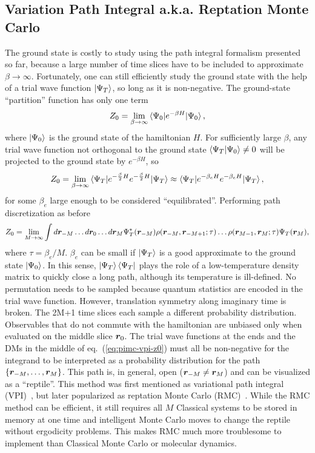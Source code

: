 \subsection{Variation Path Integral a.k.a. Reptation Monte Carlo}
The ground state is costly to study using the path integral formalism presented so far, because a large number of time slices have to be included to approximate $\beta\rightarrow\infty$. Fortunately, one can still efficiently study the ground state with the help of a trial wave function $\ket{\Psi_T}$, so long as it is non-negative. The ground-state ``partition'' function has only one term
\begin{align}
Z_0 = \lim\limits_{\beta\rightarrow\infty} \braket{\Psi_0|e^{-\beta H}|\Psi_0},
\end{align}
where $\ket{\Psi_0}$ is the ground state of the hamiltonian $H$.
For sufficiently large $\beta$, any trial wave function not orthogonal to the ground state $\braket{\Psi_T|\Psi_0}\neq0$ will be projected to the ground state by $e^{-\beta H}$, so
\begin{align} \label{eq:rmc-z0}
Z_0 = \lim\limits_{\beta\rightarrow\infty}\braket{\Psi_T|e^{-\frac{\beta}{2} H}e^{-\frac{\beta}{2} H}|\Psi_T} \approx \braket{\Psi_T|e^{-\beta_e H}e^{-\beta_e H}|\Psi_T},
\end{align}
for some $\beta_e$ large enough to be considered ``equilibrated''. Performing path discretization as before
\begin{align} \label{eq:pimc-vpi-z0}
Z_0 = \lim\limits_{M\rightarrow\infty} \int d\boldsymbol{r}_{-M}\dots d\boldsymbol{r}_0\dots d\boldsymbol{r}_{M}
\Psi_T^*(\boldsymbol{r}_{-M})\rho(\boldsymbol{r}_{-M},\boldsymbol{r}_{-M+1};\tau)\dots\rho(\boldsymbol{r}_{M-1},\boldsymbol{r}_M;\tau)\Psi_T(\boldsymbol{r}_M),
\end{align}
where $\tau=\beta_e/M$. $\beta_e$ can be small if $\ket{\Psi_T}$ is a good approximate to the ground state $\ket{\Psi_0}$. In this sense, $\ket{\Psi_T}\bra{\Psi_T}$ plays the role of a low-temperature density matrix to quickly close a long path, although its temperature is ill-defined. No permutation needs to be sampled because quantum statistics are encoded in the trial wave function. However, translation symmetry along imaginary time is broken. The 2M+1 time slices each sample a different probability distribution. Observables that do not commute with the hamiltonian are unbiased only when evaluated on the middle slice $\boldsymbol{r}_0$. The trial wave functions at the ends and the DMs in the middle of eq.~(\ref{eq:pimc-vpi-z0}) must all be non-negative for the integrand to be interpreted as a probability distribution for the path $\{\boldsymbol{r}_{-M},\dots,\boldsymbol{r}_M\}$. This path is, in general, open ($\boldsymbol{r}_{-M}\neq\boldsymbol{r}_M$) and can be visualized as a ``reptile''. This method was first mentioned as variational path integral (VPI)~\cite{Ceperley1995}, but later popularized as reptation Monte Carlo (RMC)~\cite{Baroni1999}. While the RMC method can be efficient, it still requires all $M$ Classical systems to be stored in memory at one time and intelligent Monte Carlo moves to change the reptile without ergodicity problems. This makes RMC much more troublesome to implement than Classical Monte Carlo or molecular dynamics.

